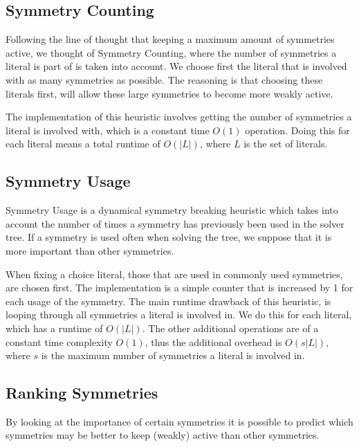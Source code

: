 \subsection{Symmetry Counting}
	Following the line of thought that keeping a maximum amount of symmetries active,
	we thought of Symmetry Counting, where the number of symmetries a literal is part of is taken into account.
	We choose first the literal that is involved with as many symmetries as possible.
	The reasoning is that choosing these literals first, will allow these large symmetries to become more weakly active.

	The implementation of this heuristic involves getting the number of symmetries a literal is involved with,
	which is a constant time $O(1)$ operation.
	Doing this for each literal means a total runtime of $O(|L|)$, where $L$ is the set of literals.


\subsection{Symmetry Usage}
	Symmetry Usage is a dynamical symmetry breaking heuristic
	which takes into account the number of times a symmetry has previously been used in the solver tree.
	If a symmetry is used often when solving the tree, we suppose that it is more important than other symmetries.

	When fixing a choice literal, those that are used in commonly used symmetries, are chosen first.
	The implementation is a simple counter that is increased by 1 for each usage of the symmetry.
	The main runtime drawback of this heuristic, is looping through all symmetries a literal is involved in.
	We do this for each literal, which has a runtime of $O(|L|)$.
	The other additional operations are of a constant time complexity $O(1)$, thus the additional overhead is $O(s|L|)$,
	where $s$ is the maximum number of symmetries a literal is involved in.

	
\subsection{Ranking Symmetries}
	By looking at the importance of certain symmetries it is possible to predict
	which symmetries may be better to keep (weakly) active than other symmetries.
